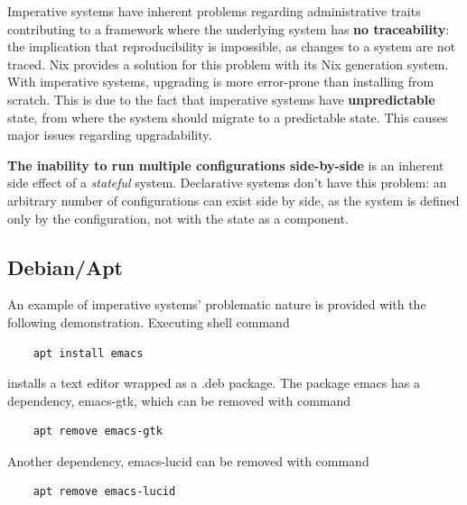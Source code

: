 Imperative systems have inherent problems regarding
administrative traits contributing to a framework where the underlying
system has \textbf{no traceability}: the implication that
reproducibility is impossible, as changes to a system are not
traced. Nix provides a solution for this problem with its Nix
generation system. With
imperative systems, upgrading is more error-prone than installing from
scratch. This is due to the fact that imperative systems have
\textbf{unpredictable} state, from where the system should migrate to
a predictable state. This causes major issues regarding
upgradability. \cite{dolstra2007purely}

\textbf{The inability to run multiple configurations side-by-side} is
an inherent side effect of a \textit{stateful} system. Declarative
systems don't have this problem: an arbitrary number of configurations
can exist side by side, as the system is defined only by the
configuration, not with the state as a
component. \cite{dolstra2007purely}

\subsection{Debian/Apt}

An example of imperative systems' problematic nature is provided with
the following demonstration. Executing shell command
\begin{lstlisting}
    apt install emacs
\end{lstlisting}
installs a text editor wrapped as a .deb package.  The package emacs
has a dependency, emacs-gtk, which can be removed with command
\begin{lstlisting}
    apt remove emacs-gtk
\end{lstlisting}
Another dependency, emacs-lucid can be removed with command
\begin{lstlisting}
    apt remove emacs-lucid
\end{lstlisting}

